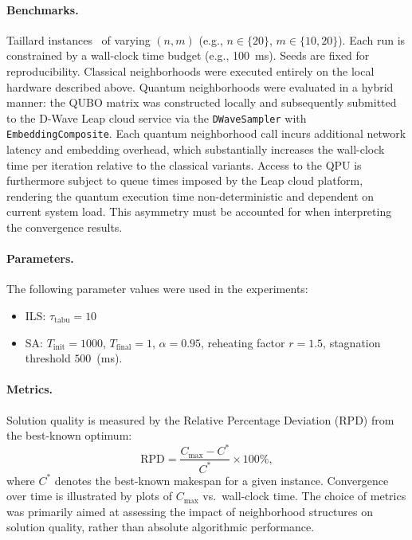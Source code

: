 \documentclass[10pt,twoside,twocolumn,a4paper]{article}
\begin{document}
\paragraph{Benchmarks.}
Taillard instances~\cite{ref_taillard} of varying $(n,m)$ (e.g., $n\in\{20\}$, $m\in\{10,20\}$). Each run is constrained by a wall-clock time budget (e.g., 100~ms). Seeds are fixed for reproducibility. Classical neighborhoods were executed entirely on the local hardware described above. Quantum neighborhoods were evaluated in a hybrid manner: the QUBO matrix was constructed locally and subsequently submitted to the D-Wave Leap cloud service via the \texttt{DWaveSampler} with \texttt{EmbeddingComposite}. Each quantum neighborhood call incurs additional network latency and embedding overhead, which substantially increases the wall-clock time per iteration relative to the classical variants. Access to the QPU is furthermore subject to queue times imposed by the Leap cloud platform, rendering the quantum execution time non-deterministic and dependent on current system load. This asymmetry must be accounted for when interpreting the convergence results.

\paragraph{Parameters.}
The following parameter values were used in the experiments:
\begin{itemize}
  \item ILS: $\tau_{\text{tabu}} = 10$
  \item SA: $T_{\text{init}}=1000$, $T_{\text{final}}=1$, $\alpha=0.95$,
        reheating factor $r = 1.5$, stagnation threshold $500$~(ms).
\end{itemize}


\paragraph{Metrics.}
Solution quality is measured by the Relative Percentage Deviation (RPD)
from the best-known optimum:
\begin{equation}
  \mathrm{RPD} = \frac{C_{\max} - C^{*}}{C^{*}} \times 100\%,
\end{equation}
where $C^{*}$ denotes the best-known makespan for a given instance.
Convergence over time is illustrated by plots of $C_{\max}$ vs.\ wall-clock
time. The choice of metrics was primarily aimed at assessing the impact of
neighborhood structures on solution quality, rather than absolute
algorithmic performance.
\end{document}
